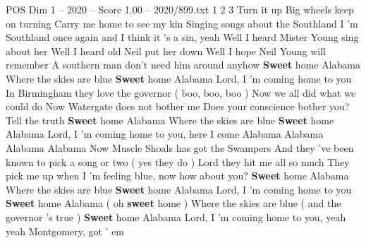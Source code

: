 \begin{textsample}{POS Dim 1 – 2020 – Score 1.00 – 2020/899.txt}  \label{ex:f1_pos_008}
1 2 3 Turn it up Big wheels keep on turning Carry me home to see my kin Singing songs about the Southland I 'm Southland once again and I think it 's a sin, yeah Well I heard Mister Young sing about her Well I heard old Neil put her down Well I hope Neil Young will remember A southern man don't need him around anyhow \textbf{Sweet} home Alabama Where the skies are blue \textbf{Sweet} home Alabama Lord, I 'm coming home to you In Birmingham they love the governor ( boo, boo, boo ) Now we all did what we could do Now Watergate does not bother me Does your conscience bother you?
Tell the truth \textbf{Sweet} home Alabama Where the skies are blue \textbf{Sweet} home Alabama Lord, I 'm coming home to you, here I come Alabama Alabama Alabama Alabama Now Muscle Shoals has got the Swampers And they 've been known to pick a song or two ( yes they do ) Lord they hit me all so much They pick me up when I 'm feeling blue, now how about you? \textbf{Sweet} home Alabama Where the skies are blue \textbf{Sweet} home Alabama Lord, I 'm coming home to you \textbf{Sweet} home Alabama ( oh \textbf{sweet} home ) Where the skies are blue ( and the governor 's true ) \textbf{Sweet} home Alabama Lord, I 'm coming home to you, yeah yeah Montgomery, got ' em

\end{textsample}
